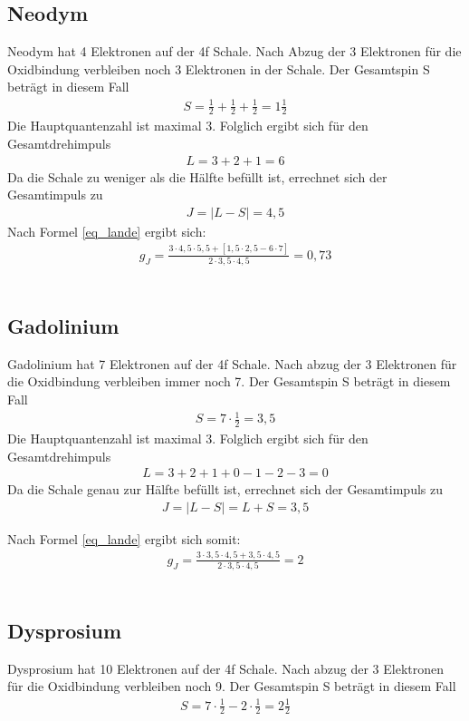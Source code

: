 \subsection{Neodym }
Neodym hat 4 Elektronen auf der 4f Schale. Nach Abzug der 3 Elektronen für die Oxidbindung verbleiben noch 3 Elektronen in der Schale. Der Gesamtspin S beträgt in diesem Fall 
\begin{align*}
S=\frac{1}{2}+ \frac{1}{2}+ \frac{1}{2} = 1 \frac{1}{2}
\end{align*}
Die Hauptquantenzahl ist maximal 3. Folglich ergibt sich für den Gesamtdrehimpuls \begin{align*}
L=3+2+1=6
\end{align*}
Da die Schale zu weniger als die Hälfte befüllt ist, errechnet sich der Gesamtimpuls zu 
\begin{align*}
J=|L-S|=4,5
\end{align*}
Nach Formel \eqref{eq_lande} ergibt sich:
\begin{align}
g_J=\frac{3\cdot4,5\cdot5,5+[1,5\cdot2,5-6\cdot7]}{2\cdot 3,5\cdot4,5}=0,73
\end{align}\\

\subsection{Gadolinium }
Gadolinium hat 7 Elektronen auf der 4f Schale. Nach abzug der 3 Elektronen für die Oxidbindung verbleiben immer noch 7. Der Gesamtspin S beträgt in diesem Fall \begin{align*}
S=7\cdot\frac{1}{2} = 3,5
\end{align*}
Die Hauptquantenzahl ist maximal 3. Folglich ergibt sich für den Gesamtdrehimpuls
\begin{align*}
L=3+2+1+0-1-2-3=0
\end{align*}
Da die Schale genau zur Hälfte befüllt ist, errechnet sich der Gesamtimpuls zu 
\begin{align*}
J=|L-S|=L+S=3,5
\end{align*}

Nach Formel \eqref{eq_lande} ergibt sich somit:
	\begin{align}
	g_J=\frac{3\cdot3,5\cdot4,5+3,5\cdot4,5}{2\cdot 3,5\cdot4,5}=2
	\end{align}\\

\subsection{Dysprosium }
Dysprosium hat 10 Elektronen auf der 4f Schale. Nach abzug der 3 Elektronen für die Oxidbindung verbleiben noch 9. Der Gesamtspin S beträgt in diesem Fall 
\begin{align*}
S= 7\cdot \frac{1}{2}-2\cdot\frac{1}{2}= 2 \frac{1}{2}
\end{align*}

